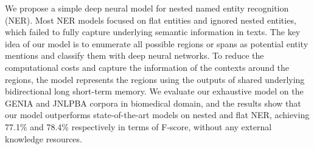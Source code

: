 We propose a simple deep neural model for nested named entity recognition (NER). Most NER models focused on flat entities and ignored nested entities, which failed to fully capture underlying semantic information in texts. The key idea of our model is to enumerate all possible regions or spans as potential entity mentions and classify them with deep neural networks. To reduce the computational costs and capture the information of the contexts around the regions, the model represents the regions using the outputs of shared underlying bidirectional long short-term memory. We evaluate our exhaustive model on the GENIA and JNLPBA corpora in biomedical domain, and the results show that our model outperforms state-of-the-art models on nested and flat NER, achieving 77.1\% and 78.4\% respectively in terms of F-score, without any external knowledge resources.

